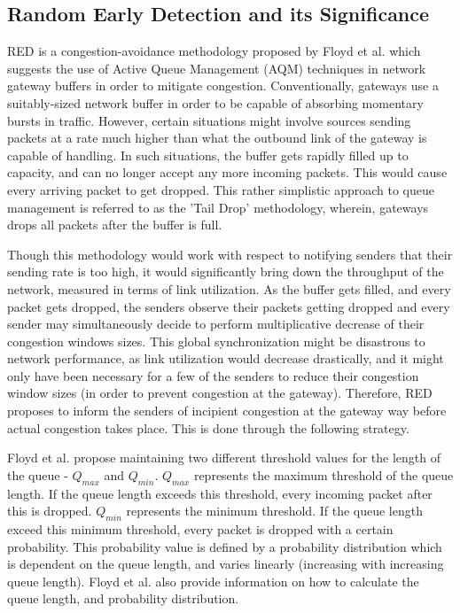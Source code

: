 \documentclass[conference, 10pt]{IEEEtran}
\begin{document}
\subsection{Random Early Detection and its Significance}
\label{sec:intro:significance}

RED is a congestion-avoidance methodology proposed by Floyd et al. \cite{floyd1993random} which suggests the use of Active Queue Management (AQM) techniques in network gateway buffers in order to mitigate congestion. Conventionally, gateways use a suitably-sized network buffer in order to be capable of absorbing momentary bursts in traffic. However, certain situations might involve sources sending packets at a rate much higher than what the outbound link of the gateway is capable of handling. In such situations, the buffer gets rapidly filled up to capacity, and can no longer accept any more incoming packets. This would cause every arriving packet to get dropped. This rather simplistic approach to queue management is referred to as the 'Tail Drop' methodology, wherein, gateways drops all packets after the buffer is full. 

Though this methodology would work with respect to notifying senders that their sending rate is too high, it would significantly bring down the throughput of the network, measured in terms of link utilization. As the buffer gets filled, and every packet gets dropped, the senders observe their packets getting dropped and every sender may simultaneously decide to perform multiplicative decrease of their congestion windows sizes. This global synchronization might be disastrous to network performance, as link utilization would decrease drastically, and it might only have been necessary for a few of the senders to reduce their congestion window sizes (in order to prevent congestion at the gateway). Therefore, RED proposes to inform the senders of incipient congestion at the gateway way before actual congestion takes place. This is done through the following strategy. 

Floyd et al. propose maintaining two different threshold values for the length of the queue - $Q_{max}$ and $Q_{min}$. $Q_{max}$ represents the maximum threshold of the queue length. If the queue length exceeds this threshold, every incoming packet after this is dropped. $Q_{min}$ represents the minimum threshold. If the queue length exceed this minimum threshold, every packet is dropped with a certain probability. This probability value is defined by a probability distribution which is dependent on the queue length, and varies linearly (increasing with increasing queue length). Floyd et al. also provide information on how to calculate the queue length, and probability distribution. 
\end{document}
